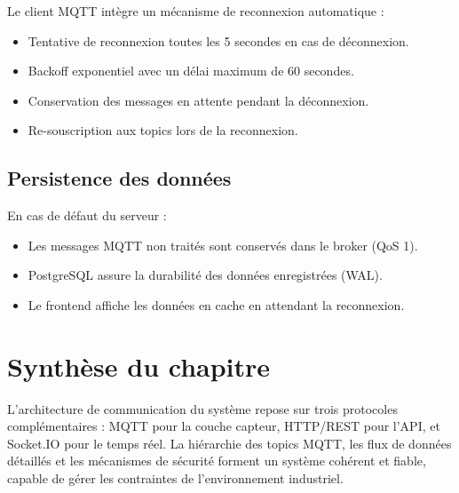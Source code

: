 Le client MQTT int\`egre un m\'ecanisme de reconnexion automatique :

\begin{itemize}
    \item Tentative de reconnexion toutes les 5 secondes en cas de d\'econnexion.
    \item Backoff exponentiel avec un d\'elai maximum de 60 secondes.
    \item Conservation des messages en attente pendant la d\'econnexion.
    \item Re-souscription aux topics lors de la reconnexion.
\end{itemize}

\subsection{Persistence des donn\'ees}

En cas de d\'efaut du serveur :

\begin{itemize}
    \item Les messages MQTT non trait\'es sont conserv\'es dans le broker (QoS 1).
    \item PostgreSQL assure la durabilit\'e des donn\'ees enregistr\'ees (WAL).
    \item Le frontend affiche les donn\'ees en cache en attendant la reconnexion.
\end{itemize}

\section{Synth\`ese du chapitre}

L'architecture de communication du syst\`eme repose sur trois protocoles compl\'ementaires : MQTT pour la couche capteur, HTTP/REST pour l'API, et Socket.IO pour le temps r\'eel. La hi\'erarchie des topics MQTT, les flux de donn\'ees d\'etaill\'es et les m\'ecanismes de s\'ecurit\'e forment un syst\`eme coh\'erent et fiable, capable de g\'erer les contraintes de l'environnement industriel.
